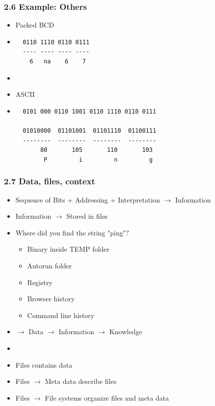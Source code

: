 \begin{frame}[fragile]
  \frametitle{2.6 Example: Others}
  \begin{itemize}
    \item[] Packed BCD
    \item[]
  \begin{verbatim}
  0110 1110 0110 0111
  ---- ---- ---- ----
    6   na    6    7
  \end{verbatim}
    \item[]
    \item[] ASCII
    \item[]
  \begin{verbatim}
  0101 000 0110 1001 0110 1110 0110 0111

  01010000  01101001  01101110  01100111
  --------  --------  --------  --------
       80       105       110       103
        P         i         n         g
  \end{verbatim}
  \end{itemize}
\end{frame}


\begin{frame}
  \frametitle{2.7 Data, files, context}
    \begin{itemize}
        \item Sequence of Bits + Addressing + Interpretation $\to$ Information
        \item Information $\to$ Stored in files
        \item Where did you find the string "ping"?
            \begin{itemize}
                \item Binary inside TEMP folder
                \item Autorun folder
                \item Registry
                \item Browser history
                \item Command line history
            \end{itemize}
        \item [] $\to$ Data $\to$ Information $\to$ Knowledge
	\item[] 
	\item Files contains data
	\item Files $\to$ Meta data describe files
        \item Files $\to$ File systems organize files and meta data
    \end{itemize}
\end{frame}









